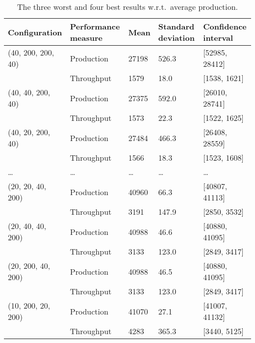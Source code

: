 \documentclass{report}
\begin{document}
\begin{table}[h]
    \begin{tabular}{|p{3cm}|p{2.5cm}|p{1.5cm}|p{1.5cm}|p{3cm}|}
    \hline
    Configuration      & Performance measure & Mean  & Standard deviation & Confidence interval \\ \hline

    (40, 200, 200, 40) & Production          & 27198 & 526.3              & [52985, 28412]      \\ \hline
                       & Throughput          & 1579  & 18.0               & [1538, 1621]        \\ \hline
    (40, 40, 200, 40)  & Production          & 27375 & 592.0              & [26010, 28741]      \\ \hline
                       & Throughput          & 1573  & 22.3               & [1522, 1625]        \\ \hline
    (40, 20, 200, 40)  & Production          & 27484 & 466.3              & [26408, 28559]      \\ \hline
                       & Throughput          & 1566  & 18.3               & [1523, 1608]        \\ \hline
    \dots              & \dots               & \dots & \dots              & \dots               \\ \hline

    (20, 20, 40, 200)  & Production          & 40960 & 66.3               & [40807, 41113]      \\ \hline
                       & Throughput          & 3191  & 147.9              & [2850, 3532]        \\ \hline
    (20, 40, 40, 200)  & Production          & 40988 & 46.6               & [40880, 41095]      \\ \hline
                       & Throughput          & 3133  & 123.0              & [2849, 3417]        \\ \hline

    (20, 200, 40, 200) & Production          & 40988 & 46.5               & [40880, 41095]      \\ \hline
                       & Throughput          & 3133  & 123.0              & [2849, 3417]        \\ \hline
    (10, 200, 20, 200) & Production          & 41070 & 27.1               & [41007, 41132]      \\ \hline
                       & Throughput          & 4283  & 365.3              & [3440, 5125]        \\ \hline
    \end{tabular}
    \caption {The three worst and four best results w.r.t.\ average production.}
    \label{table:results_table}
\end{table}
\end{document}

